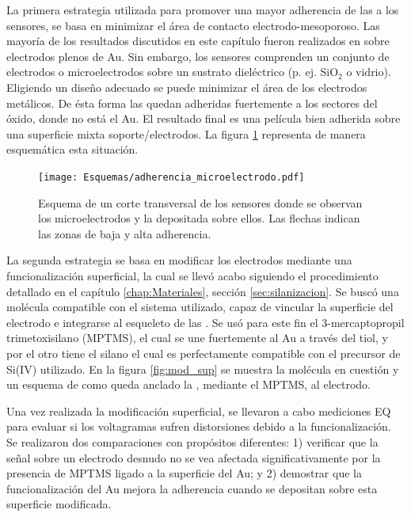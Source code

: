 			 La primera estrategia utilizada para promover una mayor adherencia de las \pdm\space a los sensores, se basa en minimizar el área de contacto electrodo-mesoporoso. Las mayoría de los resultados discutidos en este capítulo fueron realizados en \pdm\space sobre electrodos plenos de Au. Sin embargo, los sensores comprenden un conjunto de electrodos o microelectrodos sobre un sustrato dieléctrico (p. ej. SiO$_2$ o vidrio). Eligiendo un diseño adecuado se puede minimizar el área de los electrodos metálicos. De ésta forma las \pdm\space quedan adheridas fuertemente a los sectores del óxido, donde no está el Au. El resultado final es una película bien adherida sobre una superficie mixta soporte/electrodos.  La figura \ref{fig:adherencia_microelectrodo} representa de manera esquemática esta situación.
			
				\begin{figure}[!ht]
					\begin{center}
					\texttt{[image: Esquemas/adherencia\_microelectrodo.pdf]}
					\caption[Adherencia a los microelectrodos.]{Esquema de un corte transversal de los sensores donde se observan los microelectrodos y la \pdm\space depositada sobre ellos. Las flechas indican las zonas de baja y alta adherencia.}
					\label{fig:adherencia_microelectrodo}
					\end{center}
					\end{figure}
					
					
			 La segunda estrategia se basa en modificar los electrodos mediante una funcionalización superficial, la cual se llevó acabo siguiendo el procedimiento detallado en el capítulo \ref{chap:Materiales}, sección \ref{sec:silanizacion}. Se buscó una molécula compatible con el sistema utilizado, capaz de vincular la superficie del electrodo e integrarse al esqueleto de las \pdm. Se usó para este fin el 3-mercaptopropil trimetoxisilano (MPTMS), el cual se une fuertemente al Au a través del tiol\cite{Gosser,Byun2013}, y por el otro tiene el silano el cual es perfectamente compatible con el precursor de Si(IV) utilizado\cite{Wu2014,Wu2013,Chen2011}. En la figura \ref{fig:mod_sup} se muestra la molécula en cuestión y un esquema de como queda anclado la \pdm, mediante el MPTMS, al electrodo.
		
			 Una vez realizada la modificación superficial, se llevaron a cabo mediciones EQ para evaluar si los voltagramas sufren distorsiones debido a la funcionalización. Se realizaron dos comparaciones con propósitos diferentes: 1) verificar que la señal sobre un electrodo desnudo no se vea afectada significativamente por la presencia de MPTMS ligado a la superficie del Au; y 2) demostrar que la funcionalización del Au mejora la adherencia cuando se depositan \pdm\space sobre esta superficie modificada.

